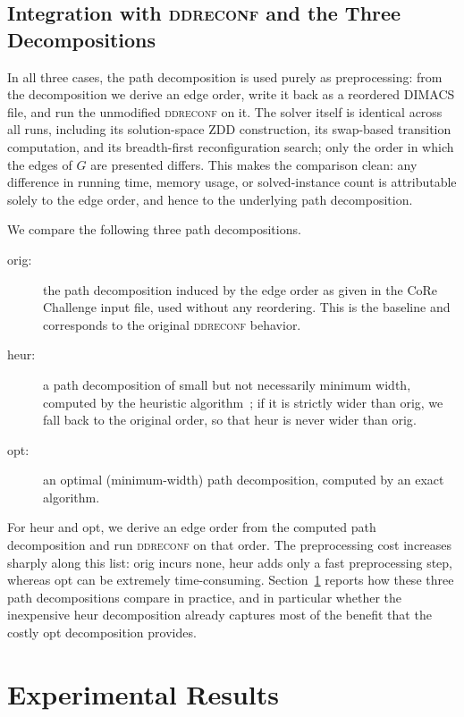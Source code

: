 \documentclass[conference]{IEEEtran}
\newcommand{\OrigDecom}{\textsf{orig}\xspace}
\newcommand{\HeurDecom}{\textsf{heur}\xspace}
\newcommand{\OptDecom}{\textsf{opt}\xspace}
\begin{document}
\subsection{Integration with \textsc{ddreconf} and the Three Decompositions}
\label{subsec:integration}

In all three cases, the path decomposition is used purely as preprocessing: from
the decomposition we derive an edge order, write it back as a reordered DIMACS
file, and run the unmodified \textsc{ddreconf} on it. The solver itself is
identical across all runs, including its solution-space ZDD construction, its
swap-based transition computation, and its breadth-first reconfiguration search;
only the order in which the edges of $G$ are presented differs. This makes the
comparison clean: any difference in running time, memory usage, or
solved-instance count is attributable solely to the edge order, and hence to the
underlying path decomposition.

We compare the following three path decompositions.
\begin{description}
  \item[\OrigDecom:] the path decomposition induced by the edge order as given in
    the CoRe Challenge input file, used without any reordering. This is the
    baseline and corresponds to the original \textsc{ddreconf} behavior.
  \item[\HeurDecom:] a path decomposition of small but not necessarily minimum
    width, computed by the heuristic algorithm~\cite{KobayashiKomuroTamaki2014};
    if it is strictly wider than \OrigDecom, we fall back to the original order,
    so that \HeurDecom is never wider than \OrigDecom.
  \item[\OptDecom:] an optimal (minimum-width) path decomposition, computed by an
    exact algorithm.
\end{description}
For \HeurDecom and \OptDecom, we derive an edge order from the computed path
decomposition and run \textsc{ddreconf} on that order. The preprocessing cost
increases sharply along this list: \OrigDecom incurs none, \HeurDecom adds only
a fast preprocessing step, whereas \OptDecom can be extremely time-consuming.
Section~\ref{sec:experiments} reports how these three path decompositions compare
in practice, and in particular whether the inexpensive \HeurDecom decomposition
already captures most of the benefit that the costly \OptDecom decomposition
provides.


\section{Experimental Results}
\label{sec:experiments}
 
\end{document}
